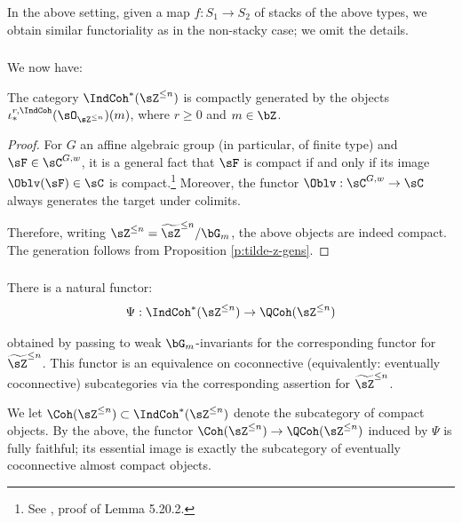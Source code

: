 \subsubsection{}

In the above setting, given a map $f:S_1 \to S_2$ of stacks of the
above types, we obtain similar functoriality as in the non-stacky case;
we omit the details.

\subsubsection{}

We now have:

\begin{cor}
\notready\label{c:z-gen}

The category $\IndCoh^*(\sZ^{\leq n})$ is compactly generated
by the objects $\iota_*^{r,\IndCoh}(\sO_{\sZ^{\leq n}})(m)$, where $r \geq 0$ and
$m \in \bZ$.

\end{cor}

\begin{proof}

For $G$ an affine algebraic group (in particular, of finite type) and
$\sF \in \sC^{G,w}$, it is a general fact that $\sF$ is compact
if and only if its image $\Oblv(\sF) \in \sC$ is compact.\footnote{See
\cite{methods}, proof of Lemma 5.20.2.}
Moreover, the functor $\Oblv:\sC^{G,w} \to \sC$ always generates
the target under colimits.

Therefore, writing $\sZ^{\leq n} = \widetilde{\sZ}^{\leq n}/\bG_m$,
the above objects are indeed compact. The generation follows from
Proposition \ref{p:tilde-z-gens}.

\end{proof}

\subsubsection{}

There is a natural functor:
%
\[
\Psi:\IndCoh^*(\sZ^{\leq n}) \to \QCoh(\sZ^{\leq n})
\]

 obtained by passing to weak $\bG_m$-invariants for
the corresponding functor for $\widetilde{\sZ}^{\leq n}$. This functor
is an equivalence on coconnective (equivalently: eventually coconnective)
subcategories via the corresponding assertion for $\widetilde{\sZ}^{\leq n}$.

We let $\Coh(\sZ^{\leq n}) \subset \IndCoh^*(\sZ^{\leq n})$
denote the subcategory of compact objects. By the above,
the functor $\Coh(\sZ^{\leq n}) \to \QCoh(\sZ^{\leq n})$
induced by $\Psi$ is fully faithful; its essential image is
exactly the subcategory of
eventually coconnective almost compact objects.

